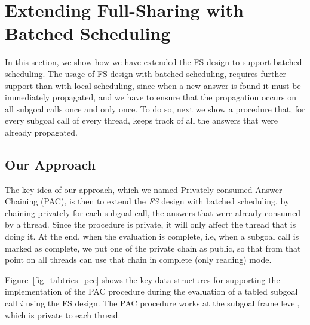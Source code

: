 \documentclass{llncs}
\begin{document}
\section{Extending Full-Sharing with Batched Scheduling}

In this section, we show how we have extended the FS design to support
batched scheduling. The usage of FS design with batched scheduling,
requires further support than with local scheduling, since when a new
answer is found it must be immediately propagated, and we have to
ensure that the propagation occurs on all subgoal calls once and only
once. To do so, next we show a procedure that, for every subgoal call
of every thread, keeps track of all the answers that were already
propagated.

\subsection{Our Approach}

The key idea of our approach, which we named Privately-consumed Answer
Chaining (PAC), is then to extend the \emph{FS} design with batched
scheduling, by chaining privately for each subgoal call, the answers
that were already consumed by a thread. Since the procedure is
private, it will only affect the thread that is doing it. At the end,
when the evaluation is complete, i.e, when a subgoal call is marked as
complete, we put one of the private chain as public, so that from that
point on all threads can use that chain in complete (only reading)
mode.

Figure~\ref{fig_tabtries_pcc} shows the key data structures for
supporting the implementation of the PAC procedure during the
evaluation of a tabled subgoal call $i$ using the FS design. %
The PAC procedure works at the subgoal frame level, which is
private to each thread.
\end{document}

